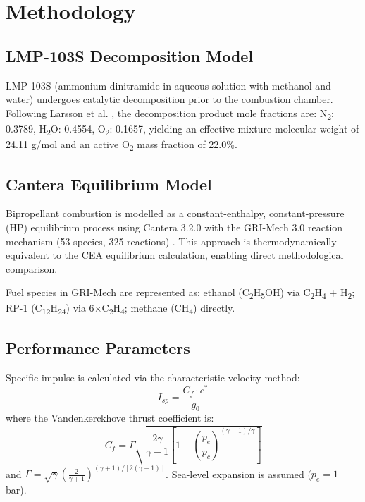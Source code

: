 \documentclass[review]{elsarticle}
\begin{document}
\section{Methodology}

\subsection{LMP-103S Decomposition Model}

LMP-103S (ammonium dinitramide in aqueous solution 
with methanol and water) undergoes catalytic decomposition 
prior to the combustion chamber. 
Following Larsson et al. \cite{Larsson2011}, the 
decomposition product mole fractions are:
N\textsubscript{2}: 0.3789, H\textsubscript{2}O: 0.4554, 
O\textsubscript{2}: 0.1657, 
yielding an effective mixture molecular weight of 
24.11 g/mol and an active O\textsubscript{2} mass 
fraction of 22.0\%.

\subsection{Cantera Equilibrium Model}

Bipropellant combustion is modelled as a constant-enthalpy, 
constant-pressure (HP) equilibrium process using Cantera 
3.2.0 \cite{Cantera2023} with the GRI-Mech 3.0 reaction mechanism (53 species, 325 reactions) \cite{GRI30}.
This approach is thermodynamically equivalent to the 
CEA equilibrium calculation, enabling direct methodological 
comparison.

Fuel species in GRI-Mech are represented as:
ethanol (C\textsubscript{2}H\textsubscript{5}OH) 
via C\textsubscript{2}H\textsubscript{4} + H\textsubscript{2};
RP-1 (C\textsubscript{12}H\textsubscript{24}) 
via 6$\times$C\textsubscript{2}H\textsubscript{4};
methane (CH\textsubscript{4}) directly.

\subsection{Performance Parameters}

Specific impulse is calculated via the characteristic 
velocity method:
\begin{equation}
    I_{sp} = \frac{C_f \cdot c^*}{g_0}
\end{equation}
where the Vandenkerckhove thrust coefficient is:
\begin{equation}
    C_f = \Gamma \sqrt{\frac{2\gamma}{\gamma-1}
    \left[1-\left(\frac{p_e}{p_c}\right)^{(\gamma-1)/\gamma}
    \right]}
\end{equation}
and $\Gamma = \sqrt{\gamma}\left(\frac{2}{\gamma+1}
\right)^{(\gamma+1)/[2(\gamma-1)]}$.
Sea-level expansion is assumed ($p_e = 1$ bar).
\end{document}
